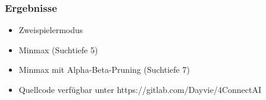 



\begin{frame}
	\frametitle{Ergebnisse}
	\begin{itemize}
		\item Zweispielermodus
		\item Minmax (Suchtiefe 5)
		\item Minmax mit Alpha-Beta-Pruning (Suchtiefe 7)
		\item Quellcode verfügbar unter https://gitlab.com/Dayvie/4ConnectAI
	\end{itemize}
\end{frame}

